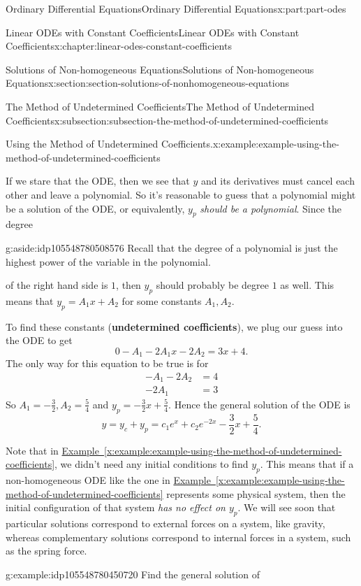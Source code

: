 \documentclass[oneside,10pt,]{book}
\newcommand{\xreffont}{\relax}
\newcommand{\terminology}[1]{\textbf{#1}}
\numberwithin{equation}{part}
\newcommand{\amp}{&}
\begin{document}
\begin{partptx}{Ordinary Differential Equations}{}{Ordinary Differential Equations}{}{}{x:part:part-odes}
\begin{chapterptx}{Linear ODEs with Constant Coefficients}{}{Linear ODEs with Constant Coefficients}{}{}{x:chapter:linear-odes-constant-coefficients}
\begin{sectionptx}{Solutions of Non-homogeneous Equations}{}{Solutions of Non-homogeneous Equations}{}{}{x:section:section-solutions-of-nonhomogeneous-equations}
\begin{subsectionptx}{The Method of Undetermined Coefficients}{}{The Method of Undetermined Coefficients}{}{}{x:subsection:subsection-the-method-of-undetermined-coefficients}
\begin{example}{Using the Method of Undetermined Coefficients.}{x:example:example-using-the-method-of-undetermined-coefficients}
\par
If we stare that the ODE, then we see that \(y\) and its derivatives must cancel each other and leave a polynomial. So it's reasonable to guess that a polynomial might be a solution of the ODE, or equivalently, \(y_{p}\) \emph{should be a polynomial}. Since the degree\begin{aside}{}{g:aside:idp105548780508576}%
Recall that the degree of a polynomial is just the highest power of the variable in the polynomial.%
\end{aside}
 of the right hand side is \(1\), then \(y_{p}\) should probably be degree \(1\) as well. This means that \(y_{p} = A_{1}x + A_{2}\) for some constants \(A_{1},A_{2}\).%
\par
To find these constants (\terminology{undetermined coefficients}), we plug our guess into the ODE to get%
\begin{equation*}
0 - A_{1} - 2A_{1}x - 2A_{2} = 3x + 4.
\end{equation*}
The only way for this equation to be true is for%
\begin{align*}
-A_{1} - 2A_{2} \amp = 4 \\
-2A_{1} \amp = 3
\end{align*}
So \(A_{1} = -\frac{3}{2}, A_{2} = \frac{5}{4}\) and \(y_{p} = -\frac{3}{2}x + \frac{5}{4}\). Hence the general solution of the ODE is%
\begin{equation*}
y = y_{c} + y_{p} = c_{1}e^{x} + c_{2}e^{-2x} - \frac{3}{2}x + \frac{5}{4}.
\end{equation*}
%
\end{example}
Note that in \hyperref[x:example:example-using-the-method-of-undetermined-coefficients]{Example~{\xreffont\ref{x:example:example-using-the-method-of-undetermined-coefficients}}}, we didn't need any initial conditions to find \(y_{p}\). This means that if a non-homogeneous ODE like the one in \hyperref[x:example:example-using-the-method-of-undetermined-coefficients]{Example~{\xreffont\ref{x:example:example-using-the-method-of-undetermined-coefficients}}} represents some physical system, then the initial configuration of that system \emph{has no effect on \(y_{p}\)}. We will see soon that particular solutions correspond to external forces on a system, like gravity, whereas complementary solutions correspond to internal forces in a system, such as the spring force.%
\begin{example}{}{g:example:idp105548780450720}%
Find the general solution of%

\end{example}
\end{subsectionptx}
\end{sectionptx}
\end{chapterptx}
\end{partptx}
\end{document}
